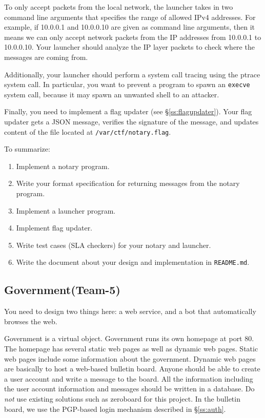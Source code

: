 \documentclass[a4paper, 11pt]{article}
\newcommand*{\Modfive}{Government\xspace}%
\theoremstyle{definition}
\begin{document}
{To only accept packets from the local network, the launcher takes in
two command line arguments that specifies the range of allowed IPv4
addresses. For example, if 10.0.0.1 and 10.0.0.10 are given as command
line arguments, then it means we can only accept network packets from
the IP addresses from 10.0.0.1 to 10.0.0.10. Your launcher should
analyze the IP layer packets to check where the messages are coming
from.

Additionally, your launcher should perform a system call tracing using
the ptrace system call. In particular, you want to prevent a program
to spawn an \texttt{execve} system call, because it may spawn an
unwanted shell to an attacker.

Finally, you need to implement a flag updater (see
\S\ref{ss:flagupdater}). Your flag updater gets a JSON message,
verifies the signature of the message, and updates content of the file
located at \texttt{/var/ctf/notary.flag}.

To summarize:
\begin{enumerate}

  \item Implement a notary program.

  \item Write your format specification for returning messages from
    the notary program.

  \item Implement a launcher program.

  \item Implement flag updater.

  \item Write test cases (SLA checkers) for your notary and launcher.

  \item Write the document about your design and implementation in
    \texttt{README.md}.

\end{enumerate}

\subsection{\Modfive (Team-5)}

You need to design two things here: a web service, and a bot that
automatically browses the web.

Government is a virtual object. Government runs its own homepage at
port 80. The homepage has several static web pages as well as dynamic
web pages. Static web pages include some information about the
government. Dynamic web pages are basically to host a web-based
bulletin board. Anyone should be able to create a user account and
write a message to the board. All the information including the user
account information and messages should be written in a database. Do
\emph{not} use existing solutions such as zeroboard for this project.
In the bulletin board, we use the PGP-based login mechanism described
in \S\ref{ss:auth}.

}
\end{document}
